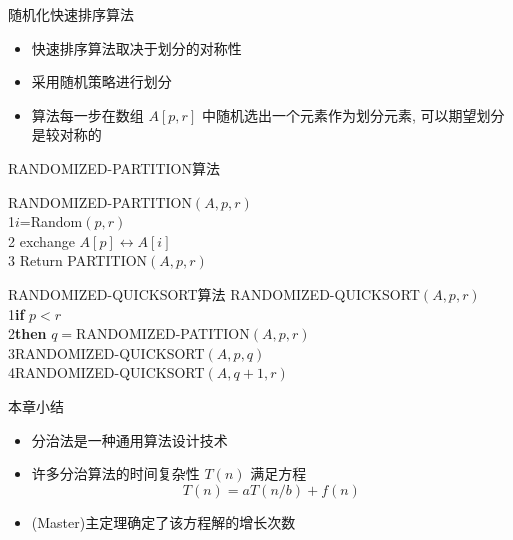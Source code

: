 \documentclass[fontset=fandol,UTF8,fleqn]{beamer}
\begin{document}
\begin{frame}{随机化快速排序算法}
\begin{itemize}[<+-|alert@+>]
\item 快速排序算法取决于划分的对称性  
\item 采用随机策略进行划分  
\item 算法每一步在数组 $A[p,r]$ 中随机选出一个元素作为划分元素, 可以期望划分是较对称的 
\end{itemize}
\end{frame}

\begin{frame}{\textsf{RANDOMIZED-PARTITION}算法}

\textsf{RANDOMIZED-PARTITION}$(A,p,r)$\\
1\qquad  $i$=\textsf{Random}$(p,r)$  \\
2 \qquad exchange $A[p]\leftrightarrow A[i]$ \\
3 \qquad Return \textsf{PARTITION}$(A,p,r)$
\end{frame}

\begin{frame}{\textsf{RANDOMIZED-QUICKSORT}算法}
\textsf{ RANDOMIZED-QUICKSORT}$(A,p,r)$\\
1\qquad \textbf{if} $p< r$\\
2\qquad  \textbf{then} $q=$\textsf{RANDOMIZED-PATITION}$(A,p,r)$\\
3\qquad \quad \textsf{RANDOMIZED-QUICKSORT}$(A,p,q)$\\
4\qquad \quad  \textsf{RANDOMIZED-QUICKSORT}$(A,q+1,r)$
\end{frame}

\begin{frame}{本章小结}
 \begin{itemize}[<+-|alert@+>]
 \item 分治法是一种通用算法设计技术
 \item 许多分治算法的时间复杂性 $T(n)$ 满足方程 
   \begin{displaymath}
     T(n)=aT(n/b)+f(n)
   \end{displaymath}
 \item (Master)主定理确定了该方程解的增长次数
 \end{itemize}
\end{frame}
\end{document}
